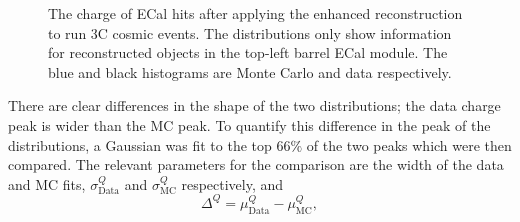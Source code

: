 \begin{figure}%
  \centering
  \caption{The charge of ECal hits after applying the enhanced reconstruction to run 3C cosmic events.  The distributions only show information for reconstructed objects in the top-left barrel ECal module.  The blue and black histograms are Monte Carlo and data respectively.}
  \label{fig:ECalThresholdCovarianceMatrices}
\end{figure}
There are clear differences in the shape of the two distributions; the data charge peak is wider than the MC peak.  To quantify this difference in the peak of the distributions, a Gaussian was fit to the top 66$\%$ of the two peaks which were then compared.  The relevant parameters for the comparison are the width of the data and MC fits, $\sigma_{\textrm{Data}}^{Q}$ and $\sigma_{\textrm{MC}}^{Q}$ respectively, and 
\begin{equation}
\Delta^Q = \mu_{\textrm{Data}}^Q - \mu_{\textrm{MC}}^Q,
\end{equation}
